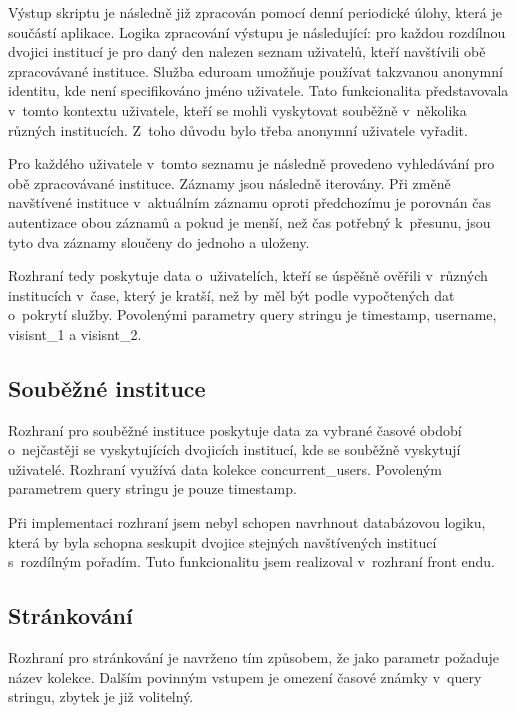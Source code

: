 \documentclass[thesis=M,czech]{FITthesis}[2012/06/26]
\begin{document}
      Výstup skriptu je následně již zpracován pomocí denní periodické úlohy, která je součástí aplikace.
      Logika zpracování výstupu je následující:
      pro každou rozdílnou dvojici institucí je pro daný den
      nalezen seznam uživatelů, kteří navštívili obě zpracovávané instituce.
      Služba eduroam umožňuje používat takzvanou anonymní identitu, kde není specifikováno jméno uživatele.
      Tato funkcionalita představovala v~tomto kontextu uživatele, kteří se mohli vyskytovat souběžně
      v~několika různých institucích. Z~toho důvodu bylo třeba anonymní uživatele vyřadit.
      
      Pro každého uživatele v~tomto seznamu je následně provedeno vyhledávání
      pro obě zpracovávané instituce.
      Záznamy jsou následně iterovány.
      Při změně navštívené instituce v~aktuálním záznamu oproti předchozímu
      je porovnán čas autentizace obou záznamů a pokud je menší,
      než čas potřebný k~přesunu, jsou tyto dva záznamy sloučeny do jednoho a uloženy.

      Rozhraní tedy poskytuje data o~uživatelích, kteří
      se úspěšně ověřili v~různých institucích v~čase, který je kratší,
      než by měl být podle vypočtených dat o~pokrytí služby.
      Povolenými parametry query stringu je timestamp, username, visisnt\_1 a visisnt\_2.

    \subsection{Souběžné instituce}
      
      Rozhraní pro souběžné instituce poskytuje data
      za vybrané časové období o~nejčastěji se vyskytujících dvojicích institucí,
      kde se souběžně vyskytují uživatelé.
      Rozhraní využívá data kolekce concurrent\_users.
      Povoleným parametrem query stringu je pouze timestamp.

      Při implementaci rozhraní jsem nebyl schopen navrhnout databázovou logiku,
      která by byla schopna seskupit dvojice stejných navštívených institucí
      s~rozdílným pořadím.
      Tuto funkcionalitu jsem realizoval v~rozhraní front endu.

    \subsection{Stránkování}
       
       Rozhraní pro stránkování je navrženo tím způsobem,
       že jako parametr požaduje název kolekce. 
       Dalším povinným vstupem je omezení časové známky
       v~query stringu, zbytek je již volitelný.
\end{document}
